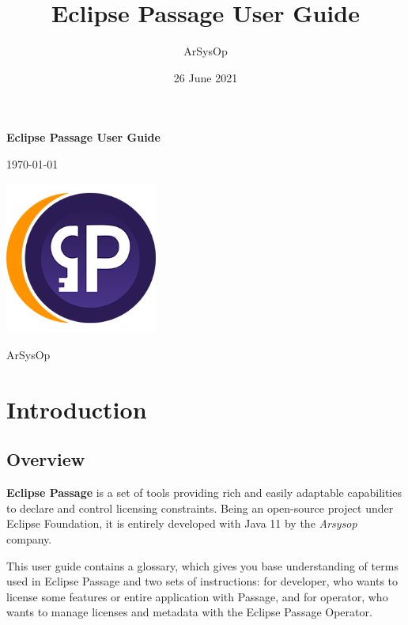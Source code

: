 \documentclass[12pt]{report}
\title{Eclipse Passage User Guide}
\author{ArSysOp}
\date{26 June 2021}
\begin{document}
\begin{titlepage}
    \begin{center}
        \vspace*{1cm}

        \Huge
        \textbf{Eclipse Passage User Guide}

        \vspace{0.5cm}

        \Large
        \today

        \vfill

        \includegraphics[width=5cm]{passage}

        \vfill

        \Large
        ArSysOp
    \end{center}
\end{titlepage}

\tableofcontents
{}

\chapter*{Introduction}

\section*{Overview}

\textbf{Eclipse Passage} is a set of tools providing rich and easily adaptable capabilities to declare and control licensing constraints.
Being an open-source project under Eclipse Foundation, it is entirely developed with Java 11 by the \textit{Arsysop} company.

This user guide contains a glossary, which gives you base understanding of terms used in Eclipse Passage and two sets of instructions: for developer, who
wants to license some features or entire application with Passage, and for operator, who wants to manage licenses and metadata with the Eclipse Passage Operator.
\end{document}
